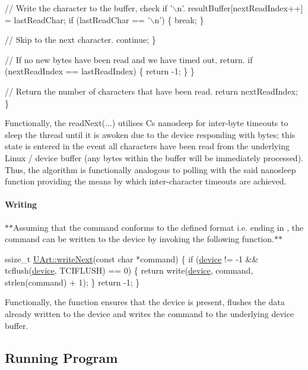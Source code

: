 \begin{DoxyCode}
            \textcolor{comment}{// Write the character to the buffer, check if '\(\backslash\)n'.}
            resultBuffer[nextReadIndex++] = lastReadChar;
            \textcolor{keywordflow}{if} (lastReadChar == \textcolor{charliteral}{'\(\backslash\)n'}) \{
                \textcolor{keywordflow}{break};
            \}

            \textcolor{comment}{// Skip to the next character.}
            \textcolor{keywordflow}{continue};
        \}

        \textcolor{comment}{// If no new bytes have been read and we have timed out, return.}
        \textcolor{keywordflow}{if} (nextReadIndex == lastReadIndex) \{
            \textcolor{keywordflow}{return} -1;
        \}
    \}

    \textcolor{comment}{// Return the number of characters that have been read.}
    \textcolor{keywordflow}{return} nextReadIndex;
\}
\end{DoxyCode}
 Functionally, the \textquotesingle{}read\+Next(...)\textquotesingle{} utilises C\textquotesingle{}s nanosleep for inter-\/byte timeouts to sleep the thread until it is awoken due to the device responding with bytes; this state is entered in the event all characters have been read from the underlying Linux / device buffer (any bytes within the buffer will be immediately processed). Thus, the algorithm is functionally analogous to polling with the said nanosleep function providing the means by which inter-\/character timeouts are achieved.

\paragraph*{Writing}

$\ast$$\ast$\+Assuming that the command conforms to the defined format i.\+e. ending in , the command can be written to the device by invoking the following function.$\ast$$\ast$ 
\begin{DoxyCode}
ssize\_t \hyperlink{class_u_art_aad1ddb133fe430a92527584eec2e674f}{UArt::writeNext}(\textcolor{keyword}{const} \textcolor{keywordtype}{char} *command)
\{
    \textcolor{keywordflow}{if} (\hyperlink{class_u_art_a61fb55cc7c92c85f2219dffcfb58bc12}{device} != -1 && tcflush(\hyperlink{class_u_art_a61fb55cc7c92c85f2219dffcfb58bc12}{device}, TCIFLUSH) == 0) \{
        \textcolor{keywordflow}{return} write(\hyperlink{class_u_art_a61fb55cc7c92c85f2219dffcfb58bc12}{device}, command, strlen(command) + 1);
    \}
    \textcolor{keywordflow}{return} -1;
\}
\end{DoxyCode}
 Functionally, the function ensures that the device is present, flushes the data already written to the device and writes the command to the underlying device buffer. \subsection*{Running Program}

 